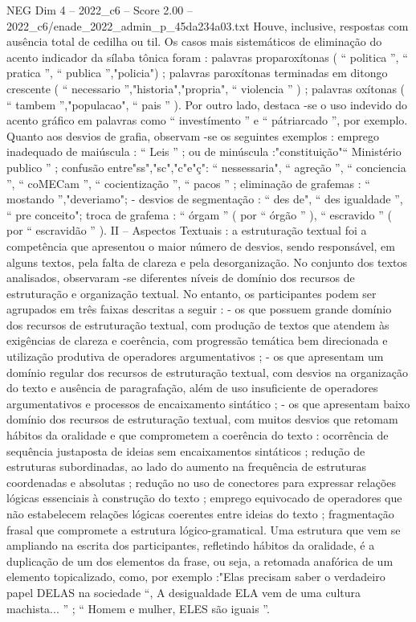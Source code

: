 \begin{textsample}{NEG Dim 4 – 2022\_c6 – Score 2.00 – 2022\_c6/enade\_2022\_admin\_p\_45da234a03.txt}
Houve, inclusive, respostas com ausência total de cedilha ou til.
Os casos mais sistemáticos de eliminação do acento indicador da sílaba tônica foram : palavras proparoxítonas ( “ politica ”, “ pratica ”, “ publica ”,"policia") ; palavras paroxítonas terminadas em ditongo crescente ( “ necessario ”,"historia","propria", “ violencia ” ) ; palavras oxítonas ( “ tambem ”,"populacao", “ pais ” ).
Por outro lado, destaca -se o uso indevido do acento gráfico em palavras como “ investímento ” e “ pátriarcado ”, por exemplo.
Quanto aos desvios de grafia, observam -se os seguintes exemplos : emprego inadequado de maiúscula : “ Leis ” ; ou de minúscula :"constituição"“ Ministério publico ” ; confusão entre"ss","sc","c"e"ç": “ nessessaria", “ agreção ”, “ conciencia ”, “ coMECam ”, “ cocientização ”, “ pacos ” ; eliminação de grafemas : “ mostando ”,"deveriamo"; - desvios de segmentação : “ des de", “ des igualdade ”, “ pre conceito"; troca de grafema : “ órgam ” ( por “ órgão ” ), “ escravido ” ( por “ escravidão ” ).
II – Aspectos Textuais : a estruturação textual foi a competência que apresentou o maior número de desvios, sendo responsável, em alguns textos, pela falta de clareza e pela desorganização.
No conjunto dos textos analisados, observaram -se diferentes níveis de domínio dos recursos de estruturação e organização textual.
No entanto, os participantes podem ser agrupados em três faixas descritas a seguir : - os que possuem grande domínio dos recursos de estruturação textual, com produção de textos que atendem às exigências de clareza e coerência, com progressão temática bem direcionada e utilização produtiva de operadores argumentativos ; - os que apresentam um domínio regular dos recursos de estruturação textual, com desvios na organização do texto e ausência de paragrafação, além de uso insuficiente de operadores argumentativos e processos de encaixamento sintático ; - os que apresentam baixo domínio dos recursos de estruturação textual, com muitos desvios que retomam hábitos da oralidade e que comprometem a coerência do texto : ocorrência de sequência justaposta de ideias sem encaixamentos sintáticos ; redução de estruturas subordinadas, ao lado do aumento na frequência de estruturas coordenadas e absolutas ; redução no uso de conectores para expressar relações lógicas essenciais à construção do texto ; emprego equivocado de operadores que não estabelecem relações lógicas coerentes entre ideias do texto ; fragmentação frasal que compromete a estrutura lógico-gramatical.
Uma estrutura que vem se ampliando na escrita dos participantes, refletindo hábitos da oralidade, é a duplicação de um dos elementos da frase, ou seja, a retomada anafórica de um elemento topicalizado, como, por exemplo :"Elas precisam saber o verdadeiro papel DELAS na sociedade “, A desigualdade ELA vem de uma cultura machista... ” ; “ Homem e mulher, ELES são iguais ”.

\end{textsample}
